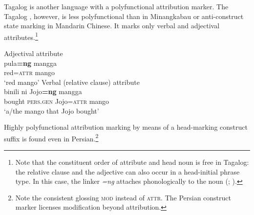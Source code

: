 Tagalog is another language with a polyfunctional attribution marker. The Tagalog , however, is less polyfunctional than  in Minangkabau or anti\hyp{}construct state marking in Mandarin Chinese. It marks only verbal and adjectival attributes.\footnote{Note that the constituent order of attribute and head noun is free in Tagalog: the relative clause and the adjective can also occur in a head-initial phrase type. In this case, the linker \textit{=ng} attaches phonologically to the noun (\citealt[1]{gil2005}; \citealt[160, 162]{himmelmann1997}).}
\begin{exe}
\ex
\label{multi tagalog}
\begin{xlist}
\ex \rm{Adjectival attribute}\\
\gll	pula\textbf{=ng} mangga\\
	red{=\textsc{attr}} mango\\
\glt	‘red mango’
\ex \rm{Verbal (relative clause) attribute}\\
\gll	binili ni Jojo\textbf{=ng} mangga\\
	bought \textsc{pers.gen} Jojo{=\textsc{attr}} mango\\
\glt	‘a/the mango that Jojo bought’
\end{xlist}
\end{exe}
Highly polyfunctional attribution marking by means of a head-marking construct suffix is found even in Persian.\footnote{Note the consistent glossing \textsc{mod} instead of \textsc{attr}. The Persian construct marker licenses modification beyond attribution.}
